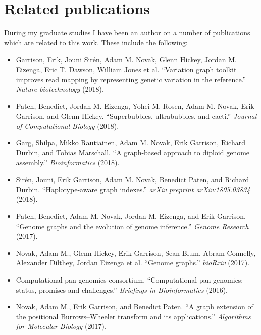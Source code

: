\chapter{Related publications}

During my graduate studies I have been an author on a number of publications which are related to this work.
These include the following:

\begin{itemize}[noitemsep]

\item Garrison, Erik, Jouni Sirén, Adam M. Novak, Glenn Hickey, Jordan M. Eizenga, Eric T. Dawson, William Jones et al. ``Variation graph toolkit improves read mapping by representing genetic variation in the reference.'' \emph{Nature biotechnology} (2018).

\item Paten, Benedict, Jordan M. Eizenga, Yohei M. Rosen, Adam M. Novak, Erik Garrison, and Glenn Hickey. ``Superbubbles, ultrabubbles, and cacti.'' \emph{Journal of Computational Biology} (2018).

\item Garg, Shilpa, Mikko Rautiainen, Adam M. Novak, Erik Garrison, Richard Durbin, and Tobias Marschall. ``A graph-based approach to diploid genome assembly.'' \emph{Bioinformatics} (2018).

\item Sirén, Jouni, Erik Garrison, Adam M. Novak, Benedict Paten, and Richard Durbin. ``Haplotype-aware graph indexes.'' \emph{arXiv preprint arXiv:1805.03834} (2018).

\item Paten, Benedict, Adam M. Novak, Jordan M. Eizenga, and Erik Garrison. ``Genome graphs and the evolution of genome inference.'' \emph{Genome Research} (2017).

\item Novak, Adam M., Glenn Hickey, Erik Garrison, Sean Blum, Abram Connelly, Alexander Dilthey, Jordan Eizenga et al. ``Genome graphs.'' \emph{bioRxiv} (2017).

\item Computational pan-genomics consortium. ``Computational pan-genomics: status, promises and challenges.'' \emph{Briefings in Bioinformatics} (2016).

\item Novak, Adam M., Erik Garrison, and Benedict Paten. ``A graph extension of the positional Burrows–Wheeler transform and its applications.'' \emph{Algorithms for Molecular Biology} (2017).

\end{itemize}
